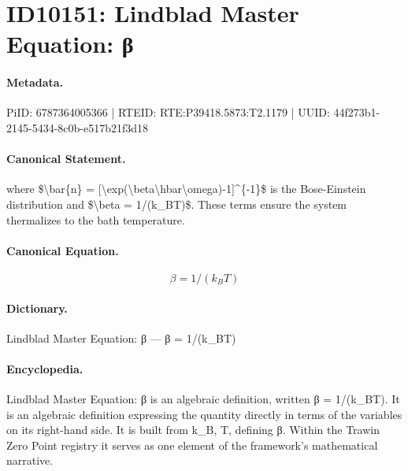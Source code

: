 \section*{ID10151: Lindblad Master Equation: β}
\paragraph{Metadata.}
PiID: 6787364005366 | RTEID: RTE:P39418.5873:T2.1179 | UUID: 44f273b1-2145-5434-8c0b-e517b21f3d18

\paragraph{Canonical Statement.}
where \$\textbackslash{}bar\{n\} = [\textbackslash{}exp(\textbackslash{}beta\textbackslash{}hbar\textbackslash{}omega)-1]\textasciicircum{}\{-1\}\$ is the Bose-Einstein distribution and \$\textbackslash{}beta = 1/(k\_BT)\$. These terms ensure the system thermalizes to the bath temperature.

\paragraph{Canonical Equation.}
\[
\beta = 1/(k_BT)
\]

\paragraph{Dictionary.}
Lindblad Master Equation: β — β = 1/(k\_BT)

\paragraph{Encyclopedia.}
Lindblad Master Equation: β is an algebraic definition, written β = 1/(k\_BT). It is an algebraic definition expressing the quantity directly in terms of the variables on its right-hand side. It is built from k\_B, T, defining β. Within the Trawin Zero Point registry it serves as one element of the framework's mathematical narrative.
